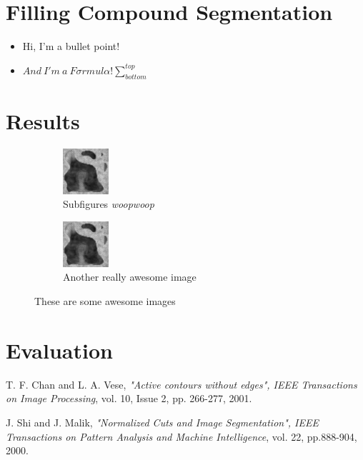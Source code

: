 \documentclass{article}
\begin{document}
  \section{Filling Compound Segmentation}
  \begin{itemize}
  	\item Hi, I'm a bullet point!
  	\item $And~ I'm~ a~ F{\sigma}rmul{\alpha}! \sum_{bottom}^{top}$
  \end{itemize}
  
  \pagebreak
  
  \section{Results}
  {
  \begin{figure}[h]
          \centering
    \begin{subfigure}[t]{0.45\linewidth}
      \centering
      \includegraphics{test.png}
      \caption{Subfigures \textit{woopwoop}}
    \end{subfigure}
    \hfill
    \begin{subfigure}[t]{0.45\linewidth}
      \centering
      \includegraphics{test.png}
      \caption{Another really awesome image}
    \end{subfigure}
    \caption{These are some awesome images}
  \end{figure}
  }

  \section{Evaluation}
  
  \pagebreak
  
	\begin{thebibliography}{9}
	
	\bibitem{[ChanVese01]}
	T. F. Chan and L. A. Vese,
	\emph{"Active contours without edges", IEEE Transactions on Image Processing},
	vol. 10, Issue 2, pp. 266-277, 2001.
	
	
	\bibitem{[ShiMalik00]}
	J.  Shi  and  J.  Malik,
	\emph{"Normalized Cuts and Image Segmentation", IEEE Transactions on Pattern Analysis and Machine Intelligence},
	vol. 22, pp.888-904,
	2000.
	
	\end{thebibliography}
\end{document}
